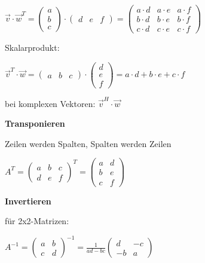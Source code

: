 $\displaystyle{
    \vec{v} \cdot \vec{w}^T = 
    \begin{pmatrix}
        a \\
        b\\
        c
    \end{pmatrix}
    \cdot
    \begin{pmatrix}
        d & e & f
    \end{pmatrix}
    = 
    \begin{pmatrix}
        a \cdot d & a \cdot e & a \cdot f\\
        b \cdot d & b \cdot e & b \cdot f\\
        c \cdot d & c \cdot e & c \cdot f
    \end{pmatrix}
}$

Skalarprodukt:

$\displaystyle{
    \vec{v}^T \cdot \vec{w} = 
    \begin{pmatrix}
        a & b & c
    \end{pmatrix}
    \cdot
    \begin{pmatrix}
        d\\
        e\\
        f
    \end{pmatrix}
    = a \cdot d + b \cdot e + c \cdot f
}$

bei komplexen Vektoren:
$\displaystyle{
    \vec{v}^H \cdot \vec{w}
}$

\textbf{Transponieren}

Zeilen werden Spalten, Spalten werden Zeilen

$\displaystyle{
    A^T =
    \begin{pmatrix}
        a & b & c\\
        d & e & f
    \end{pmatrix}^T
    =
    \begin{pmatrix}
        a & d\\
        b & e\\
        c & f
    \end{pmatrix}
}$

\textbf{Invertieren}

für 2x2-Matrizen:

$\displaystyle{
    A^{-1} =
    \begin{pmatrix}
        a & b\\
        c & d
    \end{pmatrix}^{-1}
    = \frac{1}{ad - bc}
    \begin{pmatrix}
        d & -c\\
        -b & a
    \end{pmatrix}
}$

